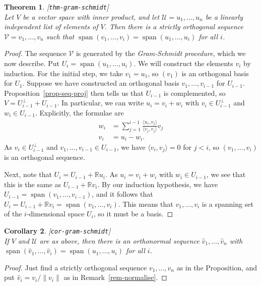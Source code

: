 \documentclass{amsart}
\newcommand{\lbl}[1]{\label{#1}\textup{[\texttt{#1}]}\ \\}
\newcommand{\lbl}{\label}
\newcommand{\R}         {{\mathbb{R}}}
\newcommand{\spn}       {\operatorname{span}}
\newcommand{\ip}[1]     {\langle #1\rangle}
\newcommand{\CU}        {{\mathcal{U}}}
\newcommand{\CV}        {{\mathcal{V}}}
\renewcommand{\:}       {\colon}
\newtheorem{theorem}{Theorem}[section]
\newtheorem{corollary}[theorem]{Corollary}
\theoremstyle{definition}
\begin{document}
\begin{theorem}\lbl{thm-gram-schmidt}
 Let $V$ be a vector space with inner product, and let
 $\CU=u_1,\dotsc,u_n$ be a linearly independent list of
 elements of $V$.  Then there is a strictly orthogonal sequence
 $\CV=v_1,\dotsc,v_n$ such that
 $\spn(v_1,\dotsc,v_i)=\spn(u_1,\dotsc,u_i)$ for all $i$.
\end{theorem}
\begin{proof}
 The sequence $\CV$ is generated by the \emph{Gram-Schmidt
  procedure}, which we now describe.  Put
 $U_i=\spn(u_1,\dotsc,u_i)$.  We will construct the elements
 $v_i$ by induction.  For the initial step, we take
 $v_1=u_1$, so $(v_1)$ is an orthogonal basis for $U_1$.
 Suppose we have constructed an orthogonal basis
 $v_1,\dotsc,v_{i-1}$ for $U_{i-1}$.
 Proposition~\ref{prop-seq-proj} then tells us that
 $U_{i-1}$ is complemented, so $V=U_{i-1}^\perp+U_{i-1}$.
 In particular, we can write $u_i=v_i+w_i$ with
 $v_i\in U_{i-1}^\perp$ and $w_i\in U_{i-1}$.  Explicitly,
 the formulae are
 \begin{align*}
  w_i &=
   \sum_{j=1}^{i-1} \frac{\ip{u_i,v_j}}{\ip{v_j,v_j}} v_j \\
  v_i &= u_i - w_i.
 \end{align*}
 As $v_i\in U_{i-1}^\perp$ and
 $v_1,\dotsc,v_{i-1}\in U_{i-1}$, we have $\ip{v_i,v_j}=0$
 for $j<i$, so $(v_1,\dotsc,v_i)$ is an orthogonal sequence.

 Next, note that $U_i=U_{i-1}+\R u_i$.  As $u_i=v_i+w_i$
 with $w_i\in U_{i-1}$, we see that this is the same as
 $U_{i-1}+\R v_i$.  By our induction hypothesis, we have
 $U_{i-1}=\spn(v_1,\dotsc,v_{i-1})$, and it follows that
 $U_i=U_{i-1}+\R v_i=\spn(v_1,\dotsc,v_i)$.  This means that
 $v_1,\dotsc,v_i$ is a spanning set of the $i$-dimensional
 space $U_i$, so it must be a basis.
\end{proof}
\begin{corollary}\lbl{cor-gram-schmidt}
 If $V$ and $\CU$ are as above, then there is an
 \emph{orthonormal} sequence $\hat{v}_1,\dotsc,\hat{v}_n$
 with
 $\spn(\hat{v}_1,\dotsc,\hat{v}_i)=\spn(u_1,\dotsc,u_i)$ for
 all $i$.
\end{corollary}
\begin{proof}
 Just find a strictly orthogonal sequence $v_1,\dotsc,v_n$
 as in the Proposition, and put $\hat{v}_i=v_i/\|v_i\|$ as in
 Remark~\ref{rem-normalise}. 
\end{proof}
\end{document}
